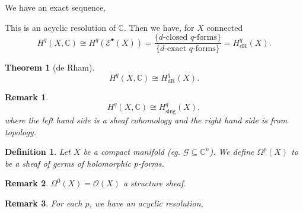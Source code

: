 \documentclass{article}
\newtheorem{theorem}{Theorem} [section]
\newtheorem{definition}{Definition}[section]
\newtheorem{remark}{Remark}[section]
\DeclareMathOperator{\dR}{dR}
\DeclareMathOperator{\sing}{sing}
\newcommand{\cE}[0]{\mathcal{E}}
\newcommand{\C}[0]{\mathbb{C}}
\newcommand{\G}[0]{\mathcal{G}}
\newcommand{\Ouv}[0]{\mathcal{O}}
\begin{document}
We have an exact sequence,
\begin{center}
\end{center}

This is an acyclic resolution of $\C$. Then we have, for $X$ connected
\begin{equation*}
  H^q(X,\C) \cong H^q(\cE^\bullet(X)) = {\frac {\{\text{$d$-closed $q$-forms}\}} {\{\text{$d$-exact $q$-forms}\}}} = H_{\dR}^q(X).
\end{equation*}

\begin{theorem}[de Rham]
  \begin{equation*}
    H^q(X,\C) \cong H^q_{\dR}(X).
  \end{equation*}
\end{theorem}

\begin{remark}
  \begin{equation*}
    H^q(X,\C) \cong H^q_{\sing}(X),
  \end{equation*}
  where the left hand side is a sheaf cohomology and the right hand side is from topology.
\end{remark}

\begin{definition}
  Let $X$ be a compact manifold (eg. $\G\subseteq\C^n$). We define $\Omega^p(X)$ to be a sheaf of germs of holomorphic $p$-forms.
\end{definition}

\begin{remark}
  $\Omega^0(X)=\Ouv(X)$ a structure sheaf.
\end{remark}

\begin{remark}
  For each $p$, we have an acyclic resolution,
  \begin{center}
  \end{center}
\end{remark}
\end{document}
